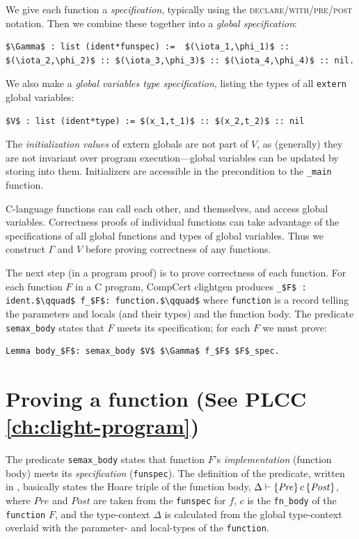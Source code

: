 \documentclass[12pt,fleqn,openany,oneside,showtrims]{memoir}
\newcommand{\ychapter}[2]{\chapter[#1]{#1 \hfill \normalsize #2}}
\begin{document}
We give each function a \emph{specification},
typically using the \textsc{declare/\linebreak[1]with/\linebreak[1]pre/\linebreak[1]post} notation.
Then we combine these together into a \emph{global specification}:
\begin{lstlisting}
$\Gamma$ : list (ident*funspec) :=  $(\iota_1,\phi_1)$ :: $(\iota_2,\phi_2)$ :: $(\iota_3,\phi_3)$ :: $(\iota_4,\phi_4)$ :: nil.
\end{lstlisting}

We also make a \emph{global variables type specification}, listing the
types of all \lstinline{extern} global variables:
\begin{lstlisting}
$V$ : list (ident*type) := $(x_1,t_1)$ :: $(x_2,t_2)$ :: nil
\end{lstlisting}
The \emph{initialization values} of extern globals are not part of $V$,
as (generally) they are not invariant over program execution---global
variables can be updated by storing into them.  Initializers are accessible
in the precondition to the \lstinline{_main} function.

C-language functions can call each other, and themselves, and access global variables.  Correctness proofs of individual functions can take advantage of the
specifications of all global functions and types of global variables.
Thus we construct $\Gamma$ and $V$ before proving correctness of any
functions.

The next  step (in a program proof) is to prove correctness of each function.
For each function $F$  in a C program, CompCert clightgen produces\linebreak
\lstinline{_$F$ : ident.$\qquad$ f_$F$: function.$\qquad$}
where \lstinline{function} is a record telling the parameters and locals (and their types) and the function body.  The predicate \lstinline{semax_body} states that $F$ meets its specification; for each $F$ we must prove:
\begin{lstlisting}
Lemma body_$F$: semax_body $V$ $\Gamma$ f_$F$ $F$_spec.
\end{lstlisting}

\ychapter{Proving a function}{(See PLCC \autoref{ch:clight-program})}

The predicate \lstinline{semax_body} states that
function $F$'s \emph{implementation} (function body)
meets its \emph{specification} (\lstinline{funspec}).
The definition of the predicate, written in ,
basically states the Hoare triple of the function body,
$\Delta\vdash \{\mathit{Pre}\}\,c\,\{\mathit{Post}\}$, where
$\mathit{Pre}$ and $\mathit{Post}$ are taken from the \lstinline{funspec}
for $f$, $c$ is the \lstinline{fn_body} of the \lstinline{function} $F$,
and the type-context $\Delta$ is calculated from the global type-context
overlaid with the parameter- and local-types of the  \lstinline{function}.
\end{document}
